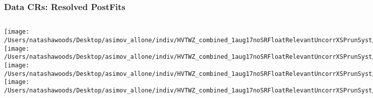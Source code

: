\documentclass{beamer}
\begin{document}
\begin{frame}
\frametitle{Data CRs: Resolved PostFits}
    \begin{columns}[t]

       \texttt{[image: /Users/natashawoods/Desktop/asimov\_allone/indiv/HVTWZ\_combined\_1aug17noSRFloatRelevantUncorrXSPrunSyst/L1\_Res\_GGF\_WZ\_Tag\_TCR.pdf]}
       \texttt{[image: /Users/natashawoods/Desktop/asimov\_allone/indiv/HVTWZ\_combined\_1aug17noSRFloatRelevantUncorrXSPrunSyst/L1\_Res\_GGF\_WZ\_Tag\_WCR.pdf]}   
       \texttt{[image: /Users/natashawoods/Desktop/asimov\_allone/indiv/HVTWZ\_combined\_1aug17noSRFloatRelevantUncorrXSPrunSyst/L1\_Res\_GGF\_WZ\_UnTag\_TCR.pdf]}
       \texttt{[image: /Users/natashawoods/Desktop/asimov\_allone/indiv/HVTWZ\_combined\_1aug17noSRFloatRelevantUncorrXSPrunSyst/L1\_Res\_GGF\_WZ\_UnTag\_WCR.pdf]}   

       
       \texttt{[image: /Users/natashawoods/Desktop/asimov\_allone/indiv/HVTWZ\_combined\_1aug17noSRFloatRelevantUncorrXSSingleBinPrunSyst/L1\_Res\_GGF\_WZ\_Tag\_TCR.pdf]}
       \texttt{[image: /Users/natashawoods/Desktop/asimov\_allone/indiv/HVTWZ\_combined\_1aug17noSRFloatRelevantUncorrXSSingleBinPrunSyst/L1\_Res\_GGF\_WZ\_Tag\_WCR.pdf]}   
       \texttt{[image: /Users/natashawoods/Desktop/asimov\_allone/indiv/HVTWZ\_combined\_1aug17noSRFloatRelevantUncorrXSSingleBinPrunSyst/L1\_Res\_GGF\_WZ\_UnTag\_TCR.pdf]}
       \texttt{[image: /Users/natashawoods/Desktop/asimov\_allone/indiv/HVTWZ\_combined\_1aug17noSRFloatRelevantUncorrXSSingleBinPrunSyst/L1\_Res\_GGF\_WZ\_UnTag\_WCR.pdf]}   
\end{columns}
\end{frame}
\end{document}
